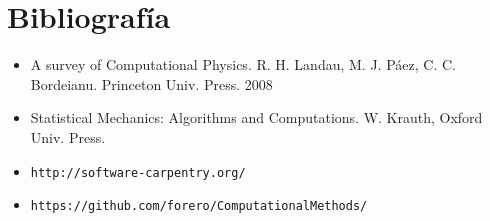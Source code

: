 \documentclass[11pt]{article}
\begin{document}
\section*{Bibliograf\'ia}
\begin{itemize}
\item
A survey of Computational Physics. R. H. Landau, M. J. P\'aez, C. C.
Bordeianu. Princeton Univ. Press. 2008 
\item
Statistical Mechanics: Algorithms and Computations. W. Krauth, Oxford Univ. Press. 
\item\verb"http://software-carpentry.org/"
\item\verb"https://github.com/forero/ComputationalMethods/"
\end{itemize}

 
\end{document}
